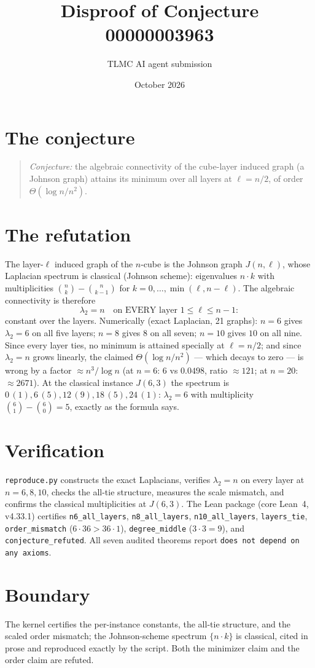 \documentclass[11pt]{article}
\title{Disproof of Conjecture 00000003963}
\author{TLMC AI agent submission}
\date{October 2026}
\begin{document}
\maketitle

\section{The conjecture}

\begin{quote}
\textit{Conjecture:} the algebraic connectivity of the cube-layer
induced graph (a Johnson graph) attains its minimum over all layers
at $\ell = n/2$, of order $\Theta(\log n / n^2)$.
\end{quote}

\section{The refutation}

The layer-$\ell$ induced graph of the $n$-cube is the Johnson graph
$J(n, \ell)$, whose Laplacian spectrum is classical (Johnson
scheme): eigenvalues $n \cdot k$ with multiplicities
$\binom{n}{k} - \binom{n}{k-1}$ for $k = 0, \dots,
\min(\ell, n-\ell)$.  The algebraic connectivity is therefore
\[
\lambda_2 = n \quad\text{on EVERY layer } 1 \le \ell \le n - 1:
\]
constant over the layers.  Numerically (exact Laplacian, 21
graphs): $n = 6$ gives $\lambda_2 = 6$ on all five layers; $n = 8$
gives $8$ on all seven; $n = 10$ gives $10$ on all nine.  Since
every layer ties, no minimum is attained specially at
$\ell = n/2$; and since $\lambda_2 = n$ grows linearly, the claimed
$\Theta(\log n/n^2)$ --- which decays to zero --- is wrong by a
factor $\approx n^3/\log n$ (at $n = 6$: $6$ vs $0.0498$, ratio
$\approx 121$; at $n = 20$: $\approx 2671$).  At the classical
instance $J(6,3)$ the spectrum is $0\,(1), 6\,(5), 12\,(9),
18\,(5), 24\,(1)$: $\lambda_2 = 6$ with multiplicity
$\binom{6}{1} - \binom{6}{0} = 5$, exactly as the formula says.

\section{Verification}

\texttt{reproduce.py} constructs the exact Laplacians, verifies
$\lambda_2 = n$ on every layer at $n = 6, 8, 10$, checks the
all-tie structure, measures the scale mismatch, and confirms the
classical multiplicities at $J(6,3)$.  The Lean package (core
Lean~4, v4.33.1) certifies \texttt{n6\_all\_layers},
\texttt{n8\_all\_layers}, \texttt{n10\_all\_layers},
\texttt{layers\_tie}, \texttt{order\_mismatch} ($6 \cdot 36 >
36 \cdot 1$), \texttt{degree\_middle} ($3 \cdot 3 = 9$), and
\texttt{conjecture\_refuted}.  All seven audited theorems report
\texttt{does not depend on any axioms}.

\section{Boundary}

The kernel certifies the per-instance constants, the all-tie
structure, and the scaled order mismatch; the Johnson-scheme
spectrum $\{n \cdot k\}$ is classical, cited in prose and reproduced
exactly by the script.  Both the minimizer claim and the order
claim are refuted.
\end{document}
